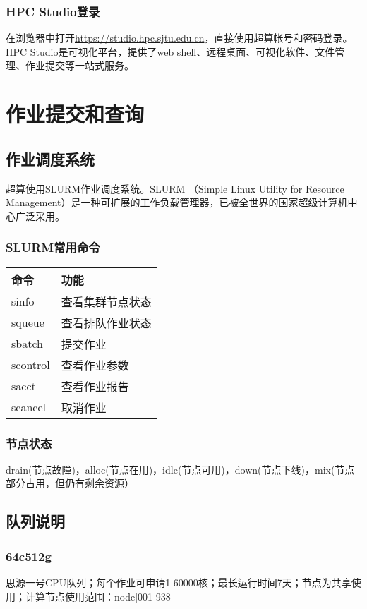 \documentclass[cn, 12pt, hang, black, chinese]{elegantbook}
\begin{document}
\subsection*{HPC Studio登录}
在浏览器中打开\href{https://studio.hpc.sjtu.edu.cn}{https://studio.hpc.sjtu.edu.cn}，直接使用超算帐号和密码登录。HPC Studio是可视化平台，提供了web shell、远程桌面、可视化软件、文件管理、作业提交等一站式服务。

\chapter{作业提交和查询}

\section{作业调度系统}
超算使用SLURM作业调度系统。SLURM （Simple Linux Utility for Resource Management）是一种可扩展的工作负载管理器，已被全世界的国家超级计算机中心广泛采用。

\subsection*{SLURM常用命令}

\begin{tabular}{ |l|l| }
 \hline
 命令 & 功能 \\
 \hline \hline
 sinfo & 查看集群节点状态 \\
 \hline
 squeue & 查看排队作业状态 \\
 \hline
 sbatch & 提交作业 \\
 \hline
 scontrol & 查看作业参数 \\
 \hline
 sacct & 查看作业报告 \\
 \hline
 scancel & 取消作业 \\
 \hline
\end{tabular}

\subsection*{节点状态}
drain(节点故障)，alloc(节点在用)，idle(节点可用)，down(节点下线)，mix(节点部分占用，但仍有剩余资源）

\section{队列说明}

\subsection*{64c512g}
思源一号CPU队列；每个作业可申请1-60000核；最长运行时间7天；节点为共享使用；计算节点使用范围：node[001-938]
\end{document}
